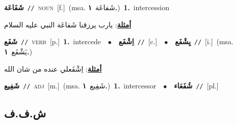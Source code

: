 \documentclass[10pt,a4paper,twoside]{article} %
\begin{document}
\begin{multicols}{2}
{\setlength\topsep{0pt}\textbf{\foreignlanguage{arabic}{شَفَاعَة}}\ {\color{gray}\texttt{//}\color{black}}\ \textsc{noun}\ [f.]\ \color{gray}(msa. \foreignlanguage{arabic}{شَفاعَة}~\foreignlanguage{arabic}{\textbf{١.}})\color{black}\ \textbf{1.}~intercession\  \begin{flushright}\color{gray}\foreignlanguage{arabic}{\textbf{\underline{\foreignlanguage{arabic}{أمثلة}}}: يارب يرزقنا شَفاعَة النبي عليه السلام}\end{flushright}\color{black}} \vspace{2mm}

{\setlength\topsep{0pt}\textbf{\foreignlanguage{arabic}{شَفَع}}\ {\color{gray}\texttt{//}\color{black}}\ \textsc{verb}\ [p.]\ \textbf{1.}~intercede\ \ $\bullet$\ \ \setlength\topsep{0pt}\textbf{\foreignlanguage{arabic}{اِشْفَع}}\ {\color{gray}\texttt{//}\color{black}}\ [c.]\ \ $\bullet$\ \ \setlength\topsep{0pt}\textbf{\foreignlanguage{arabic}{يِشْفَع}}\ {\color{gray}\texttt{//}\color{black}}\ [i.]\ \color{gray}(msa. \foreignlanguage{arabic}{يَشْفَع}~\foreignlanguage{arabic}{\textbf{١.}})\color{black}\  \begin{flushright}\color{gray}\foreignlanguage{arabic}{\textbf{\underline{\foreignlanguage{arabic}{أمثلة}}}: اِشْفَعلي عنده من شان الله}\end{flushright}\color{black}} \vspace{2mm}

{\setlength\topsep{0pt}\textbf{\foreignlanguage{arabic}{شَفِيع}}\ {\color{gray}\texttt{//}\color{black}}\ \textsc{adj}\ [m.]\ \color{gray}(msa. \foreignlanguage{arabic}{شَفِيع}~\foreignlanguage{arabic}{\textbf{١.}})\color{black}\ \textbf{1.}~intercessor\ \ $\bullet$\ \ \setlength\topsep{0pt}\textbf{\foreignlanguage{arabic}{شُفَعَاء}}\ {\color{gray}\texttt{//}\color{black}}\ [pl.]\ } \vspace{2mm}

\vspace{-3mm}
\subsection*{\color{blue}\foreignlanguage{arabic}{ش.ف.ف}\color{blue}{}} 


\end{multicols}
\end{document}
